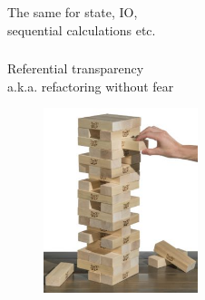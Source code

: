 \documentclass[usenames,dvipsnames, 18pt, compress, aspectratio=169]{beamer}
\begin{document}


\begin{frame}
    \frametitle{}
    \begin{center}
    The same for state, IO,\\ sequential calculations etc.
    \end{center}
\end{frame}

\begin{frame}
    \frametitle{}
    \begin{center}
    Referential transparency\\
    a.k.a. refactoring without fear

    \begin{figure}
        \includegraphics[width=0.4\textwidth,center]{giant-jenga.jpg}
    \end{figure}
    \end{center}
\end{frame}
\end{document}
